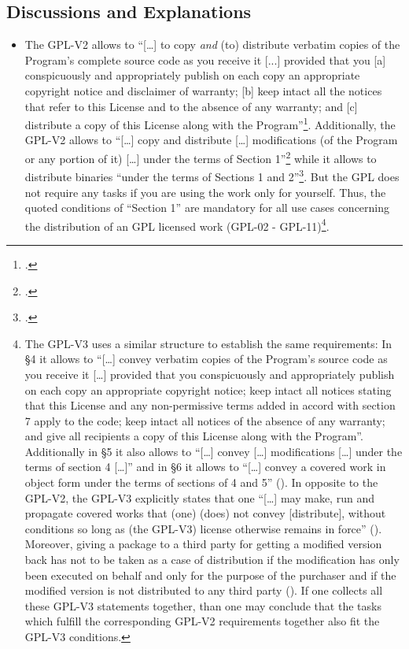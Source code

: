 \subsection{Discussions and Explanations}

\begin{itemize}
  
  \item The GPL-V2 allows to \enquote{[\ldots] to copy \emph{and} (to)
  distribute verbatim copies of the Program's complete source code as you
  receive it [...] provided that you [a] conspicuously and appropriately publish
  on each copy an appropriate copyright notice and disclaimer of warranty; [b]
  keep intact all the notices that refer to this License and to the absence of
  any warranty; and [c] distribute a copy of this License along with the
  Program}\footcite[cf.][\nopage wp.\ §1, emphasizes by
  KR]{Gpl20OsiLicense1991a}. Additionally, the GPL-V2 allows to
  \enquote{[\ldots] copy and distribute [\ldots] modifications (of the Program
  or any portion of it) [\ldots] under the terms of Section
  1}\footcite[cf.][\nopage wp.\ §2]{Gpl20OsiLicense1991a} while it allows to
  distribute binaries \enquote{under the terms of Sections 1 and
  2}\footcite[cf.][\nopage wp.\ §4]{Gpl20OsiLicense1991a}. But the GPL does not
  require any tasks if you are using the work only for yourself. Thus, the
  quoted conditions of \enquote{Section 1} are mandatory for all use cases
  concerning the distribution of an GPL licensed work (GPL-02 - GPL-11)\footnote{
  \label{Gpl3ConditionsDistri}
  The GPL-V3 uses a similar structure to establish the same requirements:
  In §4 it allows to \enquote{[\ldots] convey verbatim copies of the Program's
  source code as you receive it [\ldots] provided that you conspicuously and
  appropriately publish on each copy an appropriate copyright notice; keep
  intact all notices stating that this License and any non-permissive terms
  added in accord with section 7 apply to the code; keep intact all notices of
  the absence of any warranty; and give all recipients a copy of this License
  along with the Program}. Additionally in §5 it also allows to
  \enquote{[\ldots] convey [\ldots] modifications [\ldots] under the terms of
  section 4 [\ldots]} and in §6 it allows to \enquote{[\ldots] convey a covered
  work in object form under the terms of sections of 4 and 5}
  (\cite[cf.][\nopage wp.\ §4, §5, §6]{Gpl30OsiLicense2007a}). In opposite to
  the GPL-V2, the GPL-V3 explicitly states that one \enquote{[\ldots] may
  make, run and propagate covered works that (one) (does) not convey
  [distribute], without conditions so long as (the GPL-V3) license otherwise
  remains in force} (\cite[cf.][\nopage wp.\ §2]{Gpl30OsiLicense2007a}).
  Moreover, giving a package to a third party for getting a modified version
  back has not to be taken as a case of distribution if the modification has
  only been executed on behalf and only for the purpose of the purchaser and if
  the modified version is not distributed to any third party (\cite[cf.][\nopage
  wp.\ §2]{Gpl30OsiLicense2007a}). If one collects all these GPL-V3 statements
  together, than one may conclude that the tasks which fulfill the corresponding
  GPL-V2 requirements together also fit the GPL-V3 conditions.}.
  

\end{itemize}
